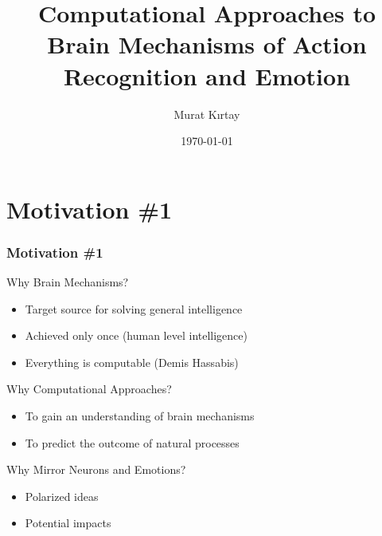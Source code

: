 \documentclass{beamer}
\title[ Mirror Neurons and Emotions]{Computational Approaches to Brain Mechanisms of Action Recognition and Emotion
 } %
\author{Murat K{\i}rtay } %
\institute[] %
{ \\ %
\medskip
\textit{muratkrty@gmail.com} %
}
\date{\today} %
\begin{document}
\begin{frame}
\titlepage %
\end{frame}



%
%


\section{Motivation \#1} %

\begin{frame}
\frametitle{Motivation \#1}

\begin{block}{Why Brain Mechanisms?}
\begin{itemize}
\item Target source for solving general intelligence
\item Achieved only once (human level intelligence) 
\item Everything is computable \tiny(Demis Hassabis) 
\end{itemize} 
\end{block}

\begin{block}{Why Computational Approaches?}
\begin{itemize}
\item To gain an understanding of brain mechanisms
\item To predict the outcome of natural processes 

\end{itemize} 
\end{block}

\begin{block}{Why Mirror Neurons and Emotions?}
\begin{itemize}
\item Polarized ideas
\item Potential impacts 

\end{itemize} 
\end{block}

\end{frame}
\end{document}
